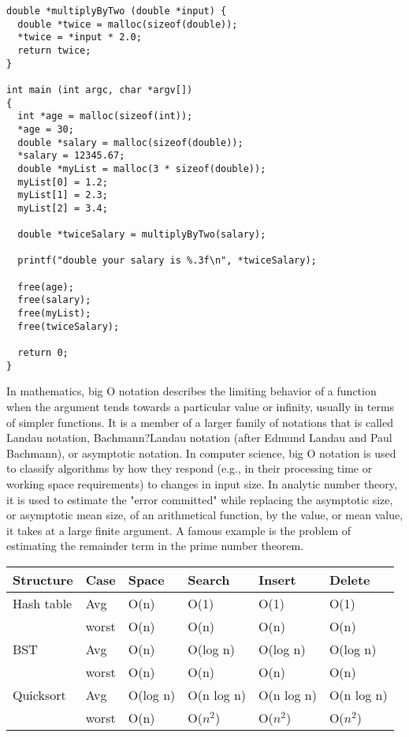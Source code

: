 \documentclass[9pt]{amsart}
\newcommand{\filldots}{\noindent \textbf {\textcolor {blue} {\dotfill}} }
\begin{document}
\begin{multicols}{2}
\begin{lstlisting}
double *multiplyByTwo (double *input) {
  double *twice = malloc(sizeof(double));
  *twice = *input * 2.0;
  return twice;
}

int main (int argc, char *argv[])
{
  int *age = malloc(sizeof(int));
  *age = 30;
  double *salary = malloc(sizeof(double));
  *salary = 12345.67;
  double *myList = malloc(3 * sizeof(double));
  myList[0] = 1.2;
  myList[1] = 2.3;
  myList[2] = 3.4;

  double *twiceSalary = multiplyByTwo(salary);

  printf("double your salary is %.3f\n", *twiceSalary);

  free(age);
  free(salary);
  free(myList);
  free(twiceSalary);

  return 0;
}
\end{lstlisting}

\filldots 

\noindent {\textcolor {blue} {\em Big-O Time}} 
\noindent In mathematics, big O notation describes the limiting behavior of a function when the argument tends towards a particular value or infinity, usually in terms of simpler functions. It is a member of a larger family of notations that is called Landau notation, Bachmann?Landau notation (after Edmund Landau and Paul Bachmann), or asymptotic notation. In computer science, big O notation is used to classify algorithms by how they respond (e.g., in their processing time or working space requirements) to changes in input size. In analytic number theory, it is used to estimate the "error committed" while replacing the asymptotic size, or asymptotic mean size, of an arithmetical function, by the value, or mean value, it takes at a large finite argument. A famous example is the problem of estimating the remainder term in the prime number theorem.

\begin{center}
    \begin{tabular}{| l | l | p{1.5cm} | p{1.5cm} | p{1.5cm} | p{1.5cm} | }
    \hline
    \textbf {Structure} & \textbf {Case} & \textbf {Space} & \textbf {Search}& \textbf {Insert} & \textbf {Delete}\\ \hline
    Hash table & Avg & O(n) & O(1) &O(1)&O(1) \\ \hline
   & worst & O(n) & O(n) &O(n)&O(n) \\ \hline
    BST & Avg & O(n) & O(log n) &O(log n)&O(log n) \\ \hline
   & worst & O(n) & O(n) &O(n)&O(n) \\ \hline
    Quicksort & Avg & O(log n) & O(n log n) &O(n log n)&O(n log n) \\ \hline
   & worst & O(n) &O($n^2$) &O($n^2$)&O($n^2$) \\ \hline
    \hline
    \end{tabular}
\end{center}



\end{multicols}
\end{document}

